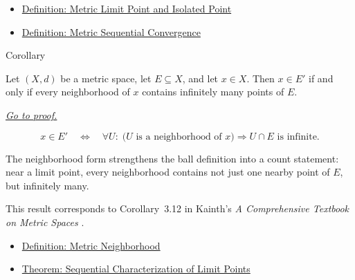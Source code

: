 \begin{dependencies}
\begin{itemize}
  \item \hyperref[def:metric-limit-point-isolated-point]{Definition: Metric Limit Point and Isolated Point}
  \item \hyperref[def:metric-sequential-convergence]{Definition: Metric Sequential Convergence}
\end{itemize}
\end{dependencies}

\begin{corollarybox}{Corollary}
\begin{corollary}
\label{cor:metric-limit-point-neighborhood-characterization}
Let \((X,d)\) be a metric space, let \(E\subseteq X\), and let \(x\in X\).
Then \(x\in E'\) if and only if every neighborhood of \(x\) contains
infinitely many points of \(E\).

\smallskip
\noindent
\hyperref[prf:metric-limit-point-neighborhood-characterization]{\textit{Go to proof.}}
\end{corollary}
\end{corollarybox}

\begin{remark*}
\[
x\in E'
\quad\Longleftrightarrow\quad
\forall U{:}\;
\bigl(U\text{ is a neighborhood of }x\bigr)
\Longrightarrow
U\cap E\text{ is infinite}.
\]
\end{remark*}

\begin{remark*}[Interpretation]
The neighborhood form strengthens the ball definition into a count statement:
near a limit point, every neighborhood contains not just one nearby point of
\(E\), but infinitely many.
\end{remark*}

\begin{remark*}
This result corresponds to Corollary~3.12 in Kainth's
\emph{A Comprehensive Textbook on Metric Spaces}
\cite{KainthComprehensiveMetricSpaces2023}.
\end{remark*}

\begin{dependencies}
\begin{itemize}
  \item \hyperref[def:metric-neighborhood]{Definition: Metric Neighborhood}
  \item \hyperref[thm:metric-limit-point-sequential-characterization]{Theorem: Sequential Characterization of Limit Points}
\end{itemize}
\end{dependencies}

